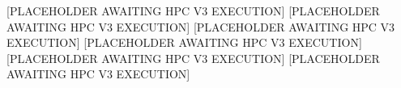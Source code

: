 [PLACEHOLDER AWAITING HPC V3 EXECUTION]
[PLACEHOLDER AWAITING HPC V3 EXECUTION]
[PLACEHOLDER AWAITING HPC V3 EXECUTION]
[PLACEHOLDER AWAITING HPC V3 EXECUTION]
[PLACEHOLDER AWAITING HPC V3 EXECUTION]
[PLACEHOLDER AWAITING HPC V3 EXECUTION]
